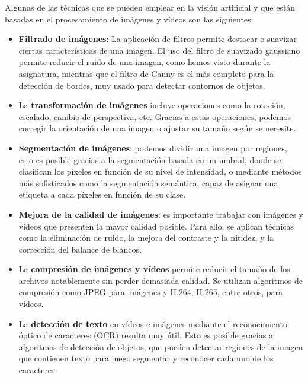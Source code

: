 Algunas de las técnicas que se pueden emplear en la visión artificial y que están basadas en el procesamiento de imágenes y vídeos son las siguientes:
\begin{itemize}
    \item \textbf{Filtrado de imágenes}: La aplicación de filtros permite destacar o suavizar ciertas características de una imagen. El uso del filtro de suavizado gaussiano permite reducir el ruido de una imagen, como hemos visto durante la asignatura, mientras que el filtro de Canny es el más completo para la detección de bordes, muy usado para detectar contornos de objetos.
    \item La \textbf{transformación de imágenes} incluye operaciones como la rotación, escalado, cambio de perspectiva, etc. Gracias a estas operaciones, podemos  corregir la orientación de una imagen o ajustar su tamaño según se necesite.
    \item \textbf{Segmentación de imágenes}: podemos dividir una imagen por regiones, esto es posible gracias a la segmentación basada en un umbral, donde se clasifican los píxeles en función de su nivel de intensidad, o mediante métodos más sofisticados como la segmentación semántica, capaz de asignar una etiqueta a cada píxeles en función de su clase.
    \item \textbf{Mejora de la calidad de imágenes}: es importante trabajar con imágenes y vídeos que presenten la mayor calidad posible. Para ello, se aplican técnicas como la eliminación de ruido, la mejora del contraste y la nitidez, y la corrección del balance de blancos.
    \item La \textbf{compresión de imágenes y vídeos} permite reducir el tamaño de los archivos notablemente sin perder demasiada calidad. Se utilizan algoritmos de compresión como JPEG para imágenes y H.264, H.265, entre otros, para vídeos.
    \item La \textbf{detección de texto} en vídeos e imágenes mediante el reconocimiento óptico de caracteres (OCR) resulta muy útil. Esto es posible gracias a algoritmos de detección de objetos, que pueden detectar regiones de la imagen que contienen texto para luego segmentar y reconocer cada uno de los caracteres.
\end{itemize}

